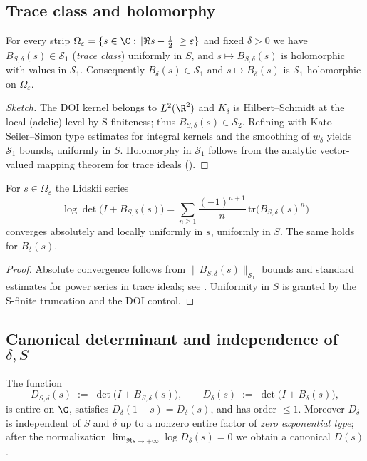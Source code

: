 \subsection*{Trace class and holomorphy}

\begin{proposition}
\label{prop:trace-class}
For every strip $\Omega_\varepsilon=\{s\in\C:\,|\Re s-\tfrac12|\ge \varepsilon\}$ and
fixed $\delta>0$ we have $B_{S,\delta}(s)\in\mathcal S_1$ (\emph{trace class}) uniformly
in $S$, and $s\mapsto B_{S,\delta}(s)$ is holomorphic with values in $\mathcal S_1$.
Consequently $B_\delta(s)\in\mathcal S_1$ and $s\mapsto B_\delta(s)$ is $\mathcal S_1$-holomorphic
on $\Omega_\varepsilon$.
\end{proposition}

\begin{proof}[Sketch]
The DOI kernel belongs to $L^2(\R^2)$ and $K_\delta$ is Hilbert–Schmidt at the local
(adelic) level by S-finiteness; thus $B_{S,\delta}(s)\in \mathcal S_2$.
Refining with Kato–Seiler–Simon type estimates for integral kernels and the smoothing of
$w_\delta$ yields $\mathcal S_1$ bounds, uniformly in $S$. Holomorphy in
$\mathcal S_1$ follows from the analytic vector-valued mapping theorem for trace ideals
(\cite[Thm.~3.7]{simon2005}).
\end{proof}

\begin{corollary}
\label{cor:lidskii}
For $s\in\Omega_\varepsilon$ the Lidskii series
\[
\log\det\bigl(I+B_{S,\delta}(s)\bigr)
=\sum_{n\ge 1}\frac{(-1)^{n+1}}{n}\,\mathrm{tr}\bigl(B_{S,\delta}(s)^n\bigr)
\]
converges absolutely and locally uniformly in $s$, uniformly in $S$. The same holds
for $B_\delta(s)$.
\end{corollary}

\begin{proof}
Absolute convergence follows from $\|B_{S,\delta}(s)\|_{\mathcal S_1}$ bounds and
standard estimates for power series in trace ideals; see \cite[Ch.~3,9]{simon2005}.
Uniformity in $S$ is granted by the S-finite truncation and the DOI control.
\end{proof}

\subsection*{Canonical determinant and independence of $\delta,S$}

\begin{theorem}
\label{thm:canonical-det}
The function
\[
D_{S,\delta}(s)\;:=\;\det\bigl(I+B_{S,\delta}(s)\bigr),
\qquad
D_\delta(s)\;:=\;\det\bigl(I+B_{\delta}(s)\bigr),
\]
is entire on $\C$, satisfies $D_\delta(1-s)=D_\delta(s)$, and
has order $\le 1$. Moreover $D_\delta$ is independent of $S$ and $\delta$ up to a
nonzero entire factor of \emph{zero exponential type}; after the normalization
$\lim_{\Re s\to +\infty}\log D_\delta(s)=0$ we obtain a canonical $D(s)$.
\end{theorem}

